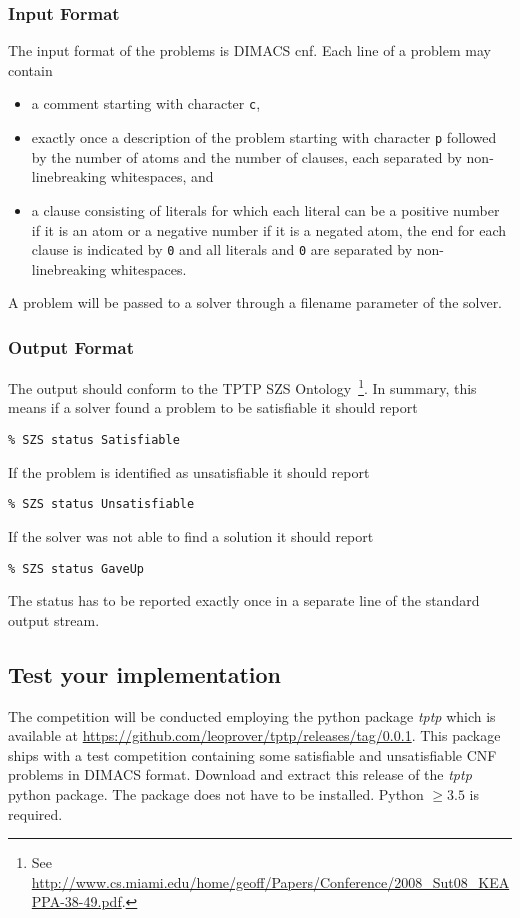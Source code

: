 \documentclass[11pt,a4paper,english]{article}
\begin{document}
\subsubsection*{Input Format}
The input format of the problems is DIMACS cnf.
Each line of a problem may contain
\begin{itemize}
    \item a comment starting with character \texttt{c},
    \item exactly once a description of the problem starting with character \texttt{p} followed by the number of atoms and the number of clauses, each separated by non-linebreaking whitespaces, and
    \item a clause consisting of literals for which each literal can be a positive number if it is an atom or a negative number if it is a negated atom, the end for each clause is indicated by \texttt{0}
          and all literals and \texttt{0} are separated by non-linebreaking whitespaces.
\end{itemize}
A problem will be passed to a solver through a filename parameter of the solver.
\pagebreak
\subsubsection*{Output Format}
The output should conform to the TPTP SZS Ontology~\footnote{See \url{http://www.cs.miami.edu/home/geoff/Papers/Conference/2008_Sut08_KEAPPA-38-49.pdf}.}.
In summary, this means if a solver found a problem to be satisfiable it should report
\begin{Verbatim}
% SZS status Satisfiable
\end{Verbatim}
If the problem is identified as unsatisfiable it should report
\begin{Verbatim}
% SZS status Unsatisfiable
\end{Verbatim}
If the solver was not able to find a solution it should report
\begin{Verbatim}
% SZS status GaveUp
\end{Verbatim}
The status has to be reported exactly once in a separate line of the standard output stream.

\subsection*{Test your implementation}
The competition will be conducted employing the python package \textit{tptp} which is available at
\url{https://github.com/leoprover/tptp/releases/tag/0.0.1}. This package ships with a test competition containing some satisfiable and unsatisfiable
CNF problems in DIMACS format.
Download and extract this release of the \textit{tptp} python package.
The package does not have to be installed. Python $\geq 3.5$ is required.
\end{document}
